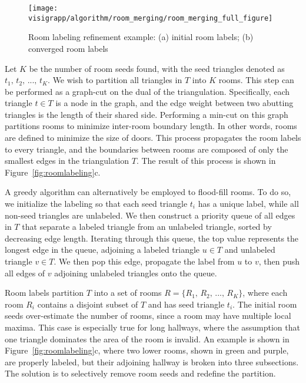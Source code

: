 \documentclass[12pt,onecolumn,oneside]{book}
\begin{document}

\begin{figure}
  \centering
  \texttt{[image: visigrapp/algorithm/room\_merging/room\_merging\_full\_figure]}
  \caption[Room labeling refinement example.]{Room labeling refinement example: (a) initial room labels; (b) converged room labels}
  \label{fig:roommerging}
\end{figure}

Let $K$ be the number of room seeds found, with the seed triangles denoted as $t_1,\,t_2,\,...,\,t_K$.  We wish to partition all triangles in $T$ into $K$ rooms.  This step can be performed as a graph-cut on the dual of the triangulation.  Specifically, each triangle $t \in T$ is a node in the graph, and the edge weight between two abutting triangles is the length of their shared side.  Performing a min-cut on this graph partitions rooms to minimize inter-room boundary length.  In other words, rooms are defined to minimize the size of doors.  This process propagates the room labels to every triangle, and the boundaries between rooms are composed of only the smallest edges in the triangulation $T$.  The result of this process is shown in Figure~\ref{fig:roomlabeling}c.

A greedy algorithm can alternatively be employed to flood-fill rooms.  To do so, we initialize the labeling so that each seed triangle $t_i$ has a unique label, while all non-seed triangles are unlabeled.  We then construct a priority queue of all edges in $T$ that separate a labeled triangle from an unlabeled triangle, sorted by decreasing edge length.  Iterating through this queue, the top value represents the longest edge in the queue, adjoining a labeled triangle $u \in T$ and unlabeled triangle $v \in T$.  We then pop this edge, propagate the label from $u$ to $v$, then push all edges of $v$ adjoining unlabeled triangles onto the queue.  


Room labels partition $T$ into a set of rooms $R = \{R_1,\,R_2,\,...,\,R_K\}$, where each room $R_i$ contains a disjoint subset of $T$ and has seed triangle $t_i$.  The initial room seeds over-estimate the number of rooms, since a room may have multiple local maxima.  This case is especially true for long hallways, where the assumption that one triangle dominates the area of the room is invalid.  An example is shown in Figure~\ref{fig:roomlabeling}c, where two lower rooms, shown in green and purple, are properly labeled, but their adjoining hallway is broken into three subsections.  The solution is to selectively remove room seeds and redefine the partition.
\end{document}
